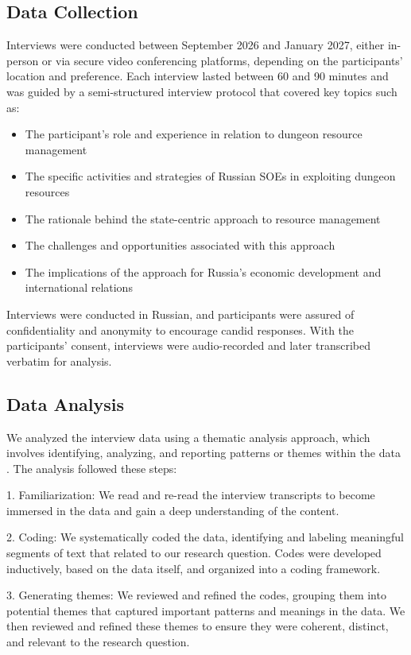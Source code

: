 \documentclass[12pt, a4paper]{article}
\begin{document}
\subsection{Data Collection}
Interviews were conducted between September 2026 and January 2027, either in-person or via secure video conferencing platforms, depending on the participants' location and preference. Each interview lasted between 60 and 90 minutes and was guided by a semi-structured interview protocol that covered key topics such as:

\begin{itemize}
    \item The participant's role and experience in relation to dungeon resource management
    \item The specific activities and strategies of Russian SOEs in exploiting dungeon resources
    \item The rationale behind the state-centric approach to resource management
    \item The challenges and opportunities associated with this approach
    \item The implications of the approach for Russia's economic development and international relations
\end{itemize}

Interviews were conducted in Russian, and participants were assured of confidentiality and anonymity to encourage candid responses. With the participants' consent, interviews were audio-recorded and later transcribed verbatim for analysis.

\subsection{Data Analysis}
We analyzed the interview data using a thematic analysis approach, which involves identifying, analyzing, and reporting patterns or themes within the data \citep{Braun2006}. The analysis followed these steps:

1. Familiarization: We read and re-read the interview transcripts to become immersed in the data and gain a deep understanding of the content.

2. Coding: We systematically coded the data, identifying and labeling meaningful segments of text that related to our research question. Codes were developed inductively, based on the data itself, and organized into a coding framework.

3. Generating themes: We reviewed and refined the codes, grouping them into potential themes that captured important patterns and meanings in the data. We then reviewed and refined these themes to ensure they were coherent, distinct, and relevant to the research question.
\end{document}
